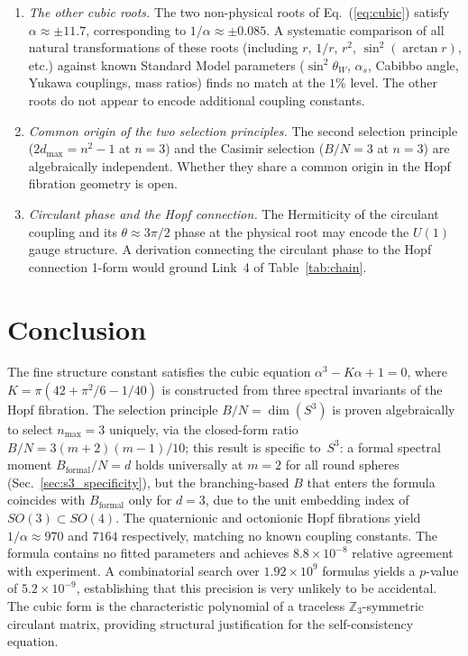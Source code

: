\documentclass[aps,prl,twocolumn,superscriptaddress]{revtex4-2}
\begin{document}
\begin{enumerate}
\item \textit{The other cubic roots.} The two non-physical roots of
  Eq.~(\ref{eq:cubic}) satisfy $\alpha \approx \pm 11.7$,
  corresponding to $1/\alpha \approx \pm 0.085$. A systematic
  comparison of all natural transformations of these roots (including
  $r$, $1/r$, $r^2$, $\sin^2(\arctan r)$, etc.) against known
  Standard Model parameters ($\sin^2\theta_W$, $\alpha_s$, Cabibbo
  angle, Yukawa couplings, mass ratios) finds no match at the $1\%$
  level. The other roots do not appear to encode additional coupling
  constants.

\item \textit{Common origin of the two selection principles.} The
  second selection principle ($2d_{\max} = n^2 - 1$ at $n = 3$) and
  the Casimir selection ($B/N = 3$ at $n = 3$) are algebraically
  independent. Whether they share a common origin in the Hopf
  fibration geometry is open.

\item \textit{Circulant phase and the Hopf connection.} The
  Hermiticity of the circulant coupling and its $\theta \approx
  3\pi/2$ phase at the physical root may encode the $U(1)$ gauge
  structure. A derivation connecting the circulant phase to the Hopf
  connection 1-form would ground Link~4 of
  Table~\ref{tab:chain}.
\end{enumerate}


\section{Conclusion}

The fine structure constant satisfies the cubic equation
$\alpha^3 - K\alpha + 1 = 0$, where
$K = \pi(42 + \pi^2/6 - 1/40)$ is constructed from three spectral
invariants of the Hopf fibration. The selection principle
$B/N = \dim(S^3)$ is proven algebraically to select $n_{\max} = 3$
uniquely, via the closed-form ratio $B/N = 3(m+2)(m-1)/10$; this
result is specific to~$S^3$: a formal spectral moment
$B_{\mathrm{formal}}/N = d$ holds universally at $m = 2$ for all
round spheres (Sec.~\ref{sec:s3_specificity}), but the
branching-based $B$ that enters the formula coincides with
$B_{\mathrm{formal}}$ only for $d = 3$, due to the unit embedding
index of $SO(3) \subset SO(4)$. The quaternionic and octonionic Hopf
fibrations yield $1/\alpha \approx 970$ and $7164$ respectively,
matching no known coupling constants. The formula contains no fitted parameters and achieves
$8.8 \times 10^{-8}$ relative agreement with experiment. A
combinatorial search over $1.92 \times 10^9$ formulas yields a
$p$-value of $5.2 \times 10^{-9}$, establishing that this precision
is very unlikely to be accidental. The cubic form is the
characteristic polynomial of a traceless $\mathbb{Z}_3$-symmetric
circulant matrix, providing structural justification for the
self-consistency equation.
\end{document}
